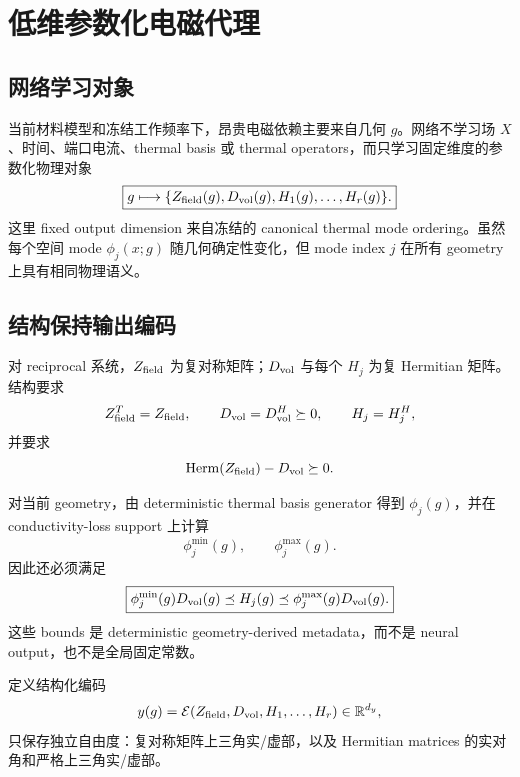 \section{低维参数化电磁代理}

\subsection{网络学习对象}
当前材料模型和冻结工作频率下，昂贵电磁依赖主要来自几何 $g$。网络不学习场 $X$、时间、端口电流、thermal basis 或 thermal operators，而只学习固定维度的参数化物理对象
\begin{equation}
\boxed{
 g\longmapsto
 \{Z_{\rm field}(g),D_{\rm vol}(g),H_1(g),\ldots,H_r(g)\}.
}
\end{equation}
这里 fixed output dimension 来自冻结的 canonical thermal mode ordering。虽然每个空间 mode $\phi_j(x;g)$ 随几何确定性变化，但 mode index $j$ 在所有 geometry 上具有相同物理语义。

\subsection{结构保持输出编码}
对 reciprocal 系统，$Z_{\rm field}$ 为复对称矩阵；$D_{\rm vol}$ 与每个 $H_j$ 为复 Hermitian 矩阵。结构要求
\begin{equation}
Z_{\rm field}^T=Z_{\rm field},
\qquad
D_{\rm vol}=D_{\rm vol}^H\succeq0,
\qquad
H_j=H_j^H,
\end{equation}
并要求
\begin{equation}
\operatorname{Herm}(Z_{\rm field})-D_{\rm vol}\succeq0.
\end{equation}

对当前 geometry，由 deterministic thermal basis generator 得到 $\phi_j(g)$，并在 conductivity-loss support 上计算
\begin{equation}
\phi_j^{\min}(g),\qquad\phi_j^{\max}(g).
\end{equation}
因此还必须满足
\begin{equation}
\boxed{
\phi_j^{\min}(g)D_{\rm vol}(g)
\preceq H_j(g)
\preceq
\phi_j^{\max}(g)D_{\rm vol}(g).
}
\end{equation}
这些 bounds 是 deterministic geometry-derived metadata，而不是 neural output，也不是全局固定常数。

定义结构化编码
\begin{equation}
y(g)=\mathcal E\!\left(Z_{\rm field},D_{\rm vol},H_1,\ldots,H_r\right)\in\mathbb{R}^{d_y},
\end{equation}
只保存独立自由度：复对称矩阵上三角实/虚部，以及 Hermitian matrices 的实对角和严格上三角实/虚部。

